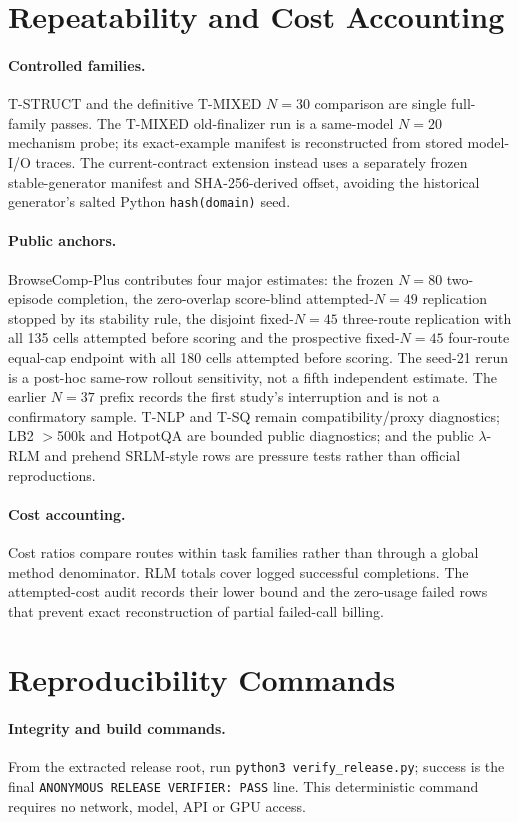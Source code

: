 \documentclass[letterpaper]{article}
\begin{document}
\FloatBarrier
\section{Repeatability and Cost Accounting}

\paragraph{Controlled families.}
T-STRUCT and the definitive T-MIXED $N=30$ comparison are single full-family passes. The T-MIXED old-finalizer run is a same-model $N=20$ mechanism probe; its exact-example manifest is reconstructed from stored model-I/O traces. The current-contract extension instead uses a separately frozen stable-generator manifest and SHA-256-derived offset, avoiding the historical generator's salted Python \texttt{hash(domain)} seed.

\paragraph{Public anchors.}
BrowseComp-Plus contributes four major estimates: the frozen $N=80$ two-episode completion, the zero-overlap score-blind attempted-$N=49$ replication stopped by its stability rule, the disjoint fixed-$N=45$ three-route replication with all 135 cells attempted before scoring and the prospective fixed-$N=45$ four-route equal-cap endpoint with all 180 cells attempted before scoring. The seed-21 rerun is a post-hoc same-row rollout sensitivity, not a fifth independent estimate. The earlier $N=37$ prefix records the first study's interruption and is not a confirmatory sample. T-NLP and T-SQ remain compatibility/proxy diagnostics; LB2 $>$500k and HotpotQA are bounded public diagnostics; and the public $\lambda$-RLM and prehend SRLM-style rows are pressure tests rather than official reproductions.

\paragraph{Cost accounting.}
Cost ratios compare routes within task families rather than through a global method denominator. RLM totals cover logged successful completions. The attempted-cost audit records their lower bound and the zero-usage failed rows that prevent exact reconstruction of partial failed-call billing.
\section{Reproducibility Commands}

\paragraph{Integrity and build commands.}
From the extracted release root, run \texttt{python3 verify\_release.py};
success is the final \texttt{ANONYMOUS RELEASE VERIFIER: PASS} line. This
deterministic command requires no network, model, API or GPU access.
\end{document}
